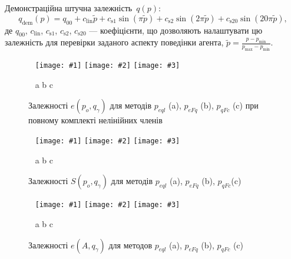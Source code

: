 \documentclass[14pt,handout,utf8]{beamer}
\newcommand{\Xhead}[1]{
 \begin{center}%
      \textbf{#1}%
 \end{center}%
}
\newcommand{\ABClbl}{%
  \vspace{-2.9ex}
  \begin{center}
    ~ \hfill a \hfill\hfill b \hfill\hfill c \hfill ~
  \end{center}
  \vspace{-2.0ex}
}
\newcommand{\PicTriple}[3]{%
 \begin{center}
    ~ \hfill
    \texttt{[image: \#1]}
    \hfill
    \texttt{[image: \#2]}
    \hfill
    \texttt{[image: \#3]}
    \hfill ~
  \end{center}
  \ABClbl
}
\begin{document}

\begin{frame}
  \frametitle{~}

  Демонстраційна штучна залежність~$q(p)$:
  \begin{equation}
    q_\mathrm{dem}(p) = q_{00} + c_\mathrm{lin} \tilde{p} + c_\mathrm{s1} \sin( \pi \tilde{p} ) + c_\mathrm{s2} \sin( 2 \pi \tilde{p} ) + c_\mathrm{s20} \sin( 20 \pi \tilde{p} ),
    \label{atu:eq:q_dem}
  \end{equation}
  де $q_{00}$, $c_\mathrm{lin}$, $c_\mathrm{s1}$, $c_\mathrm{s2}$, $c_\mathrm{s20}$
  ---
  коефіцієнти, що дозволяють налаштувати цю залежність для перевірки заданого аспекту поведінки агента,
  $\tilde{p} = \frac{p - p_{\min}}{p_{\max} - p_{\min}}$.

  \begin{figure}
    \PicTriple{../p3/p/qls_pe-p_po_qg_eql_all_xl.png}{../p3/p/qls_pe-p_po_qg_eFq_all_xl.png}{../p3/p/qls_pe-p_po_qg_eFc_all_xl.png}
    \caption{Залежності $e(p_o,q_\gamma)$ для методів $p_{eql}$ (a), $p_{eFq}$ (b), $p_{qFc}$ (c) при повному комплекті нелінійних членів}
    \label{atu:f:qsl_pe_po_qg_all}
  \end{figure}

  \begin{figure}
    \PicTriple{../p3/p/qls_pe-p_po_qg_Sql_all_xl.png}{../p3/p/qls_pe-p_po_qg_SFq_all_xl.png}{../p3/p/qls_pe-p_po_qg_SFc_all_xl.png}
    \caption{Залежності $S(p_o,q_\gamma)$ для методів $p_{eql}$ (a), $p_{eFq}$ (b), $p_{qFc}$(c)}
    \label{atu:f:qsl_S_po_qg_all}
  \end{figure}

  \vspace{-3ex}

  \begin{figure}[htb!]
    \PicTriple{../p3/p/qls_pe-p_A_qg_eql_all_xl.png}{../p3/p/qls_pe-p_A_qg_eFq_all_xl.png}{../p3/p/qls_pe-p_A_qg_eFc_all_xl.png}
    \caption{Залежності $e(A,q_\gamma)$ для методов $p_{eql}$ (a), $p_{eFq}$ (b), $p_{qFc}$ (c)}
    \label{atu:f:qsl_pe_A_qg_all}
  \end{figure}
\end{frame}


\end{document}

